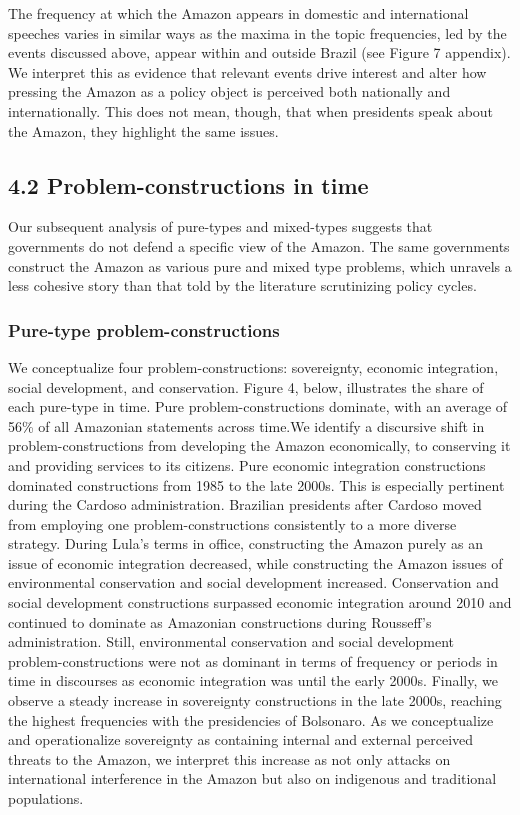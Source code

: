 \documentclass[
  12pt,
]{article}
\begin{document}
The frequency at which the Amazon appears in domestic and international
speeches varies in similar ways as the maxima in the topic frequencies,
led by the events discussed above, appear within and outside Brazil (see
Figure 7 appendix). We interpret this as evidence that relevant events
drive interest and alter how pressing the Amazon as a policy object is
perceived both nationally and internationally. This does not mean,
though, that when presidents speak about the Amazon, they highlight the
same issues.

\hypertarget{problem-constructions-in-time}{%
\subsection{4.2 Problem-constructions in
time}\label{problem-constructions-in-time}}

Our subsequent analysis of pure-types and mixed-types suggests that
governments do not defend a specific view of the Amazon. The same
governments construct the Amazon as various pure and mixed type
problems, which unravels a less cohesive story than that told by the
literature scrutinizing policy cycles.

\hypertarget{pure-type-problem-constructions}{%
\subsubsection{Pure-type
problem-constructions}\label{pure-type-problem-constructions}}

We conceptualize four problem-constructions: sovereignty, economic
integration, social development, and conservation. Figure 4, below,
illustrates the share of each pure-type in time. Pure
problem-constructions dominate, with an average of 56\% of all Amazonian
statements across time.We identify a discursive shift in
problem-constructions from developing the Amazon economically, to
conserving it and providing services to its citizens. Pure economic
integration constructions dominated constructions from 1985 to the late
2000s. This is especially pertinent during the Cardoso administration.
Brazilian presidents after Cardoso moved from employing one
problem-constructions consistently to a more diverse strategy. During
Lula's terms in office, constructing the Amazon purely as an issue of
economic integration decreased, while constructing the Amazon issues of
environmental conservation and social development increased.
Conservation and social development constructions surpassed economic
integration around 2010 and continued to dominate as Amazonian
constructions during Rousseff's administration. Still, environmental
conservation and social development problem-constructions were not as
dominant in terms of frequency or periods in time in discourses as
economic integration was until the early 2000s. Finally, we observe a
steady increase in sovereignty constructions in the late 2000s, reaching
the highest frequencies with the presidencies of Bolsonaro. As we
conceptualize and operationalize sovereignty as containing internal and
external perceived threats to the Amazon, we interpret this increase as
not only attacks on international interference in the Amazon but also on
indigenous and traditional populations.
\end{document}
